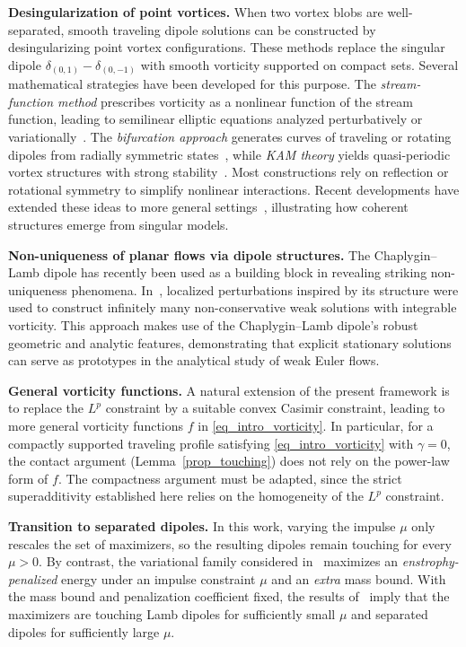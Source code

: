 \documentclass[11pt]{amsart}
\theoremstyle{definition}
\theoremstyle{definition}
\numberwithin{equation}{section}
\newcommand{\0}{\emptyset}
\begin{document}
	
	\noindent\textbf{Desingularization of point vortices.}
	When two vortex blobs are well-separated, smooth traveling dipole solutions can be constructed by desingularizing point vortex configurations.
	These methods replace the singular dipole $\delta_{(0,1)}-\delta_{(0,-1)}$ with smooth vorticity supported on compact sets.
	Several mathematical strategies have been developed for this purpose.
	The \emph{stream-function method} prescribes vorticity as a nonlinear function of the stream function, leading to semilinear elliptic equations analyzed perturbatively or variationally~\cite{Nor1975, Yang1991, SS2010}.
	The \emph{bifurcation approach} generates curves of traveling or rotating dipoles from radially symmetric states~\cite{Wan1986, Wan1988, HMW2020}, while \emph{KAM theory} yields quasi-periodic vortex structures with strong stability~\cite{HHR2024}.
	Most constructions rely on reflection or rotational symmetry to simplify nonlinear interactions.
	Recent developments have extended these ideas to more general settings~\cite{HM2017, CWZ2020, CLZ2021, CLW2024, CJY2024, DPMP, BCM2025, DHLM2025}, illustrating how coherent structures emerge from singular models.
	
	
	\medskip
	
	\noindent\textbf{Non-uniqueness of planar flows via dipole structures.}
	The Chaplygin--Lamb dipole has recently been used as a building block in revealing striking non-uniqueness phenomena.
	In~\cite{BCK2024}, localized perturbations inspired by its structure were used to construct infinitely many non-conservative weak solutions with integrable vorticity.
	This approach makes use of the Chaplygin--Lamb dipole’s robust geometric and analytic features, demonstrating that explicit stationary solutions can serve as prototypes in the analytical study of weak Euler flows.

    
    {
    \medskip

    \noindent \textbf{General vorticity functions.}
    A natural extension of the present framework is to replace the $L^p$ constraint by a suitable convex Casimir constraint, leading to more general vorticity functions $f$ in \eqref{eq_intro_vorticity}.
    In particular, for a compactly supported traveling profile satisfying \eqref{eq_intro_vorticity} with $\gamma = 0$, the contact argument (Lemma~\ref{prop_touching}) does not rely on the power-law form of $f$.
    The compactness argument must be adapted, since the strict superadditivity established here relies on the homogeneity of the $L^p$ constraint.

    \medskip

    \noindent \textbf{Transition to separated dipoles.}
    In this work, varying the impulse $\mu$ only rescales the set of maximizers, so the resulting dipoles remain touching for every $\mu > 0$.
    By contrast, the variational family considered in~\cite{AC2022} maximizes an \emph{enstrophy-penalized} energy under an impulse constraint $\mu$ and an \textit{extra} mass bound.
    With the  mass bound and penalization coefficient fixed, the results of~\cite{AC2022} imply that the maximizers are touching Lamb dipoles for sufficiently small $\mu$ and separated dipoles for sufficiently large $\mu$.
    }
    
\end{document}
